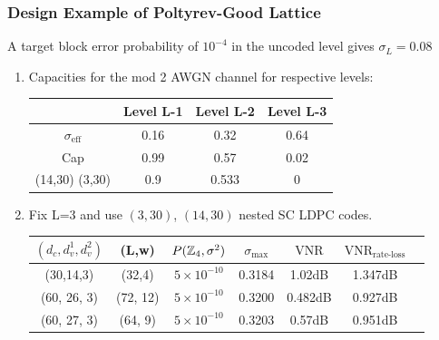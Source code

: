 \documentclass[10pt]{beamer}
\begin{document}
\begin{frame}\frametitle{Design Example of Poltyrev-Good Lattice}
A target block error probability of $10^{-4}$ in the uncoded level gives $\sigma_{L}=0.08$
\begin{enumerate}
\item  Capacities for the mod 2 AWGN  channel for respective levels: 
\vspace{0.1in}
\begin{center}
\begin{tabular}{| c | c | c | c | }
\hline
 & Level L-1   &  Level L-2  & Level L-3 \\
\hline 
$\sigma_{\text{eff}}$ & 0.16   &  0.32  & 0.64 \\ \hline
 Cap                             &  0.99 & 0.57 & 0.02 \\   \hline
 (14,30) (3,30)         &  0.9 & 0.533 & 0 \\   \hline
\end{tabular}
\end{center}
\pause
\vspace{0.1in}
\item Fix L=3 and use $(3,30)$, $(14,30)$ nested SC LDPC codes.
\vspace{0.07in}
\begin{center}
\begin{tabular}{c c c c c c c}
\hline  \hline
$(d_{c},d_{v}^{1},d_{v}^{2})$ &(L,w)& $P(\mathbb{Z}_{4},\sigma^{2})$ & $\sigma_{\text{max}}$ &$\text{VNR}$ &$\text{VNR}_{\text{rate-loss}}$\\
\hline
(30,14,3) & (32,4) & $5 \times 10^{-10}$ & 0.3184 & 1.02dB & 1.347dB\pause \\
(60, 26, 3)& (72, 12)& $5 \times 10^{-10}$ & 0.3200 &0.482dB & 0.927dB\\
(60, 27, 3)& (64, 9)& $5 \times 10^{-10}$  &  0.3203 & 0.57dB & 0.951dB\\
\end{tabular}
\end{center}
\end{enumerate}
\end{frame}
\end{document}
